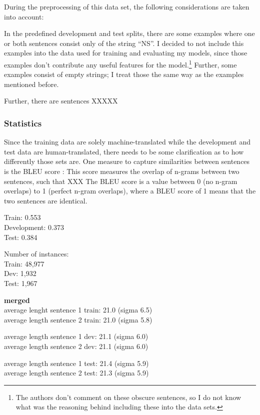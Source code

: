 During the preprocessing of this data set, the following considerations are taken into account:

In the predefined development and test splits, there are some examples where one or both sentences consist
only of the string ``NS''.
I decided to not include this examples into the data used for training and evaluating my models, since
those examples don't contribute any useful features for the model.\footnote{The authors don't comment on these obscure sentences, so I do not know what was the reasoning behind including these into the data sets.}
Further, some examples consist of empty strings; I treat those the same way as the examples mentioned before.

Further, there are sentences XXXXX

\subsubsection{Statistics}

Since the training data are solely machine-translated while the development and test data are human-translated, there needs to be some clarification as to how differently those sets are.
One measure to capture similarities between sentences is the BLEU score \cite{papineni2002bleu}:
This score measures the overlap of n-grams between two sentences, such that XXX
The BLEU score is a value between 0 (no n-gram overlaps) to 1 (perfect n-gram overlaps), where a BLEU score of 1 means that the two sentences are identical.

Train: 0.553 \\
Development: 0.373 \\
Test: 0.384

Number of instances: \\
Train: 48,977 \\
Dev: 1,932 \\
Test: 1,967

\textbf{merged} \\
average lenght sentence 1 train: 21.0 (sigma 6.5) \\
average length sentence 2 train: 21.0 (sigma 5.8)

average length sentence 1 dev: 21.1 (sigma 6.0) \\
average length sentence 2 dev: 21.1 (sigma 6.0)

average length sentence 1 test: 21.4 (sigma 5.9) \\
average length sentence 2 test: 21.3 (sigma 5.9)

